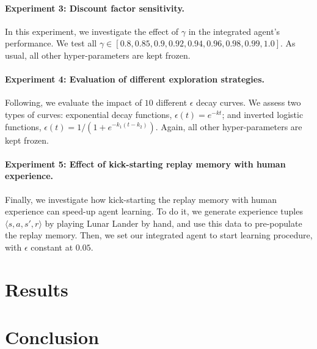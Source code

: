 \documentclass{article}
\begin{document}
    \paragraph{Experiment 3: Discount factor sensitivity.}
    In this experiment, we investigate the effect of $\gamma$ in the integrated agent's performance.
    We test all $\gamma \in [0.8, 0.85, 0.9, 0.92, 0.94, 0.96, 0.98, 0.99, 1.0]$.
    As usual, all other hyper-parameters are kept frozen.

    \paragraph{Experiment 4: Evaluation of different exploration strategies.}
    Following, we evaluate the impact of $10$ different $\epsilon$ decay curves.
    We assess two types of curves: exponential decay functions, $\epsilon(t) = e^{-k t}$; and inverted logistic functions, $\epsilon(t) = 1 / (1 + e^{-k_{1} (t - k_{2})})$.
    Again, all other hyper-parameters are kept frozen.

    \paragraph{Experiment 5: Effect of kick-starting replay memory with human experience.}
    Finally, we investigate how kick-starting the replay memory with human experience can speed-up agent learning.
    To do it, we generate experience tuples $\langle s, a, s', r \rangle$ by playing Lunar Lander by hand, and use this data to pre-populate the replay memory.
    Then, we set our integrated agent to start learning procedure, with $\epsilon$ constant at $0.05$.

    \section{Results}
    \label{sec:results}

    \lipsum[1]
    \lipsum[2]

    \lipsum[3]
    \lipsum[4]

    \lipsum[5]
    \lipsum[6]

    \lipsum[1]
    \lipsum[2]

    \lipsum[3]
    \lipsum[4]

    \lipsum[5]
    \lipsum[6]

    \section{Conclusion}
    \label{sec:conclusion}

    \lipsum[1]

\printbibliography
\end{document}
